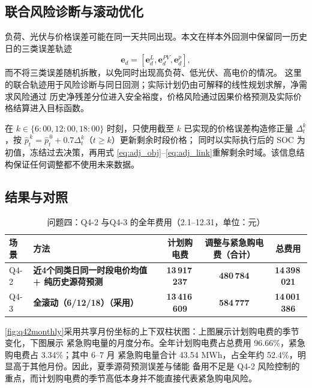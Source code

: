 \documentclass[withoutpreface,bwprint]{cumcmthesis}
\begin{document}
\subsection{联合风险诊断与滚动优化}

负荷、光伏与价格误差可能在同一天共同出现。本文在样本外回测中保留同一历史日的三类误差轨迹
\begin{equation}
\bm e_d=\left[\bm e_d^{L},\bm e_d^{PV},\bm e_d^{p}\right],
\label{eq:q4jointres}
\end{equation}
而不将三类误差随机拆散，以免同时出现高负荷、低光伏、高电价的情况。
这里的联合轨迹用于风险诊断与同日回测；实际计划仍由可解释的线性规划求解，净需求风险通过
历史净残差分位进入安全裕度，价格风险通过因果价格预测及实际价格结算进入目标函数。

在 $k\in\{6{:}00,12{:}00,18{:}00\}$ 时刻，只使用截至 $k$ 已实现的价格误差构造修正量
$\Delta_t^k$，按
$\widehat p_t^{\,k}=\widehat p_t^{\,0}+0.7\Delta_t^k$（$t\ge k$）更新剩余时段价格；
同时以实际执行后的 SOC 为初值，冻结过去决策，再用式
\eqref{eq:adj_obj}--\eqref{eq:adj_link}重解剩余时域。该信息结构保证任何调整都不使用未来数据。

\subsection{结果与对照}

\begin{table}[htbp]
\centering
\caption{问题四：Q4-2 与Q4-3 的全年费用（2.1--12.31，单位：元）}
\label{tab:q4cmp}
\begin{tabular}{@{}llccc@{}}
\toprule
场景 & 方法 & 计划购电费 & 调整与紧急购电费（合计） & 总费用 \\
\midrule
Q4-2
& \textbf{近4个同类日同一时段电价均值 + 纯历史源荷预测} & \textbf{13\,917\,237} & \textbf{480\,784} & \textbf{14\,398\,021} \\
\midrule
Q4-3
& \textbf{全滚动（6/12/18）（采用）} & \textbf{13\,416\,609} & \textbf{584\,777} & \textbf{14\,001\,386} \\
\bottomrule
\end{tabular}
\end{table}

\cref{fig:q42monthly}采用共享月份坐标的上下双柱状图：上图展示计划购电费的季节变化，下图展示
紧急购电量的月度分布。全年计划购电费占总费用 96.66\%，紧急购电费占 3.34\%；其中 6--7 月
紧急购电量合计 43.54 MWh，占全年约 52.4\%，明显高于其他月份。因此，夏季源荷预测误差与储能
备用不足是 Q4-2 风险控制的重点，而计划购电费的季节高低本身并不能直接代表紧急购电风险。
\end{document}
